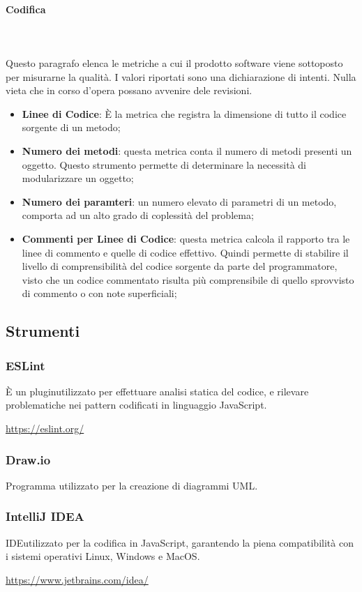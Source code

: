 			\paragraph{Codifica} \mbox{} \\ \mbox{} \\
			Questo paragrafo elenca le metriche a cui il prodotto software viene sottoposto per misurarne la qualità.
			I valori riportati sono una dichiarazione di intenti. Nulla vieta che in corso d'opera possano avvenire dele revisioni.
			\begin{itemize}
			\item \textbf{Linee di Codice}: È la metrica che registra la dimensione di tutto il codice sorgente di un metodo;
			\item \textbf{Numero dei metodi}: questa metrica conta il numero di metodi presenti un oggetto. Questo strumento permette di determinare la necessità di modularizzare un oggetto;
			\item \textbf{Numero dei paramteri}: un numero elevato di parametri di un metodo, comporta ad un alto grado di coplessità del problema;
			\item \textbf{Commenti per Linee di Codice}: questa metrica calcola il rapporto tra le linee di commento e quelle di codice effettivo. Quindi permette di stabilire il livello di comprensibilità del codice sorgente da parte del programmatore, visto che un codice commentato risulta più comprensibile di quello sprovvisto di commento o con note superficiali;
			\end{itemize}
	\subsection{Strumenti}
	\subsubsection{ESLint}
	È un plugin\glo utilizzato per effettuare analisi statica del codice, e rilevare problematiche nei pattern codificati in linguaggio JavaScript\glo. \\
	\centerline{\url{https://eslint.org/}}
	\subsubsection{Draw.io}
	Programma utilizzato per la creazione di diagrammi UML.
	\subsubsection{IntelliJ IDEA}
	IDE\glo utilizzato per la codifica in JavaScript, garantendo la piena compatibilità con i sistemi operativi Linux, Windows e MacOS.\\		
	\centerline{\url{https://www.jetbrains.com/idea/}}
